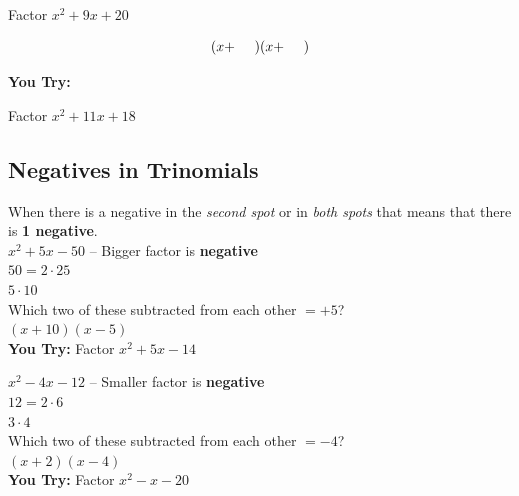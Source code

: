 \documentclass[11pt]{article}
\begin{document}
Factor $x^2+9x+20$\\

\vspace{1in}

$$(x+\hspace{.5cm})(x+\hspace{.5cm})$$

\hrulefill

\textbf{You Try:}

Factor $x^2+11x+18$\\


\pagebreak


\subsection*{Negatives in Trinomials}


When there is a negative in the \textit{second spot} or in \textit{both spots} that means that there is \textbf{1 negative}.\\

$x^2+5x-50$ -- Bigger factor is \textbf{negative}\\

$50=2\cdot25$\\ \hspace{1cm}$5\cdot10$\\

Which two of these subtracted from each other $=+5$?\\

$(x+10)(x-5)$\\

\textbf{You Try:} Factor $x^2+5x-14$

\vspace{.75in}


\hrulefill

$x^2-4x-12$ -- Smaller factor is \textbf{negative}\\

$12=2\cdot 6$\\ \hspace{1cm}$3\cdot4$\\

Which two of these subtracted from each other $=-4$?\\

$(x+2)(x-4)$\\

\textbf{You Try:} Factor $x^2-x-20$\\

\vspace{.75in}
\end{document}
